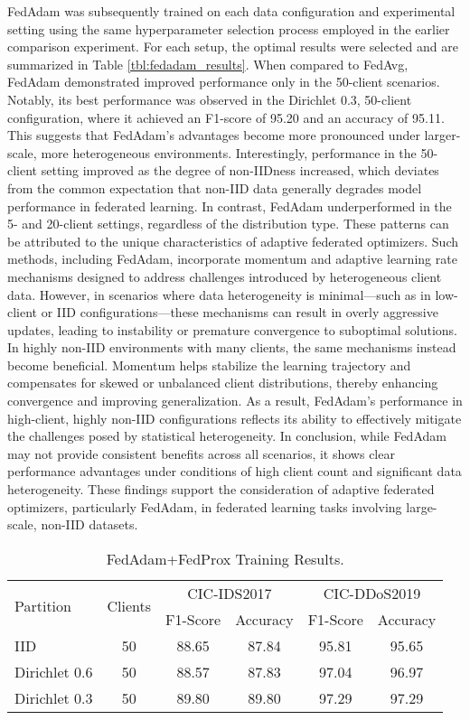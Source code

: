 FedAdam was subsequently trained on each data configuration and experimental setting using the same hyperparameter selection process employed in the earlier comparison experiment. For each setup, the optimal results were selected and are summarized in Table \ref{tbl:fedadam_results}. When compared to FedAvg, FedAdam demonstrated improved performance only in the 50-client scenarios. Notably, its best performance was observed in the Dirichlet 0.3, 50-client configuration, where it achieved an F1-score of 95.20 and an accuracy of 95.11. This suggests that FedAdam’s advantages become more pronounced under larger-scale, more heterogeneous environments. Interestingly, performance in the 50-client setting improved as the degree of non-IIDness increased, which deviates from the common expectation that non-IID data generally degrades model performance in federated learning. In contrast, FedAdam underperformed in the 5- and 20-client settings, regardless of the distribution type. These patterns can be attributed to the unique characteristics of adaptive federated optimizers. Such methods, including FedAdam, incorporate momentum and adaptive learning rate mechanisms designed to address challenges introduced by heterogeneous client data. However, in scenarios where data heterogeneity is minimal—such as in low-client or IID configurations—these mechanisms can result in overly aggressive updates, leading to instability or premature convergence to suboptimal solutions. In highly non-IID environments with many clients, the same mechanisms instead become beneficial. Momentum helps stabilize the learning trajectory and compensates for skewed or unbalanced client distributions, thereby enhancing convergence and improving generalization. As a result, FedAdam's performance in high-client, highly non-IID configurations reflects its ability to effectively mitigate the challenges posed by statistical heterogeneity. In conclusion, while FedAdam may not provide consistent benefits across all scenarios, it shows clear performance advantages under conditions of high client count and significant data heterogeneity. These findings support the consideration of adaptive federated optimizers, particularly FedAdam, in federated learning tasks involving large-scale, non-IID datasets.

\begin{table}[h]
    \caption{FedAdam+FedProx Training Results.}
    \centering
    \begin{tabular}{l|c|c|c|c|c}
        \multirow{2}{*}{Partition} & \multirow{2}{*}{Clients} & \multicolumn{2}{|c|}{CIC-IDS2017} & \multicolumn{2}{|c}{CIC-DDoS2019} \\
        \cline{3-6} & & F1-Score & Accuracy & F1-Score & Accuracy \\
        \hline\hline
        IID & 50 & 88.65 & 87.84 & 95.81 & 95.65 \\
        Dirichlet 0.6 & 50 & 88.57 & 87.83 & 97.04 & 96.97 \\
        Dirichlet 0.3 & 50 & 89.80 & 89.80 & 97.29 & 97.29 \\
    \end{tabular}
    \label{tbl:fedadam_fedprox_results}
\end{table}

